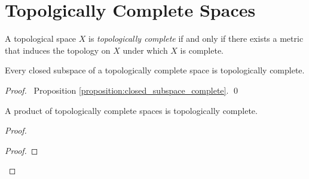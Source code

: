 \section{Topolgically Complete Spaces}

\begin{definition}
    A topological space $X$ is \emph{topologically complete} if and only if there exists a metric that induces the topology on $X$
    under which $X$ is complete.
\end{definition}

\begin{proposition}
    \label{proposition:closed_subspace_topolgically_complete}
    Every closed subspace of a topologically complete space is topologically complete.
\end{proposition}

\begin{proof}
    \pf\ Proposition \ref{proposition:closed_subspace_complete}. \qed
\end{proof}

\begin{proposition}[Choice]
    \label{proposition:product_topologically_complete}
    A product of topologically complete spaces is topologically complete.
\end{proposition}

\begin{proof}
    \pf
    \begin{proof}
    \end{proof}
\end{proof}

